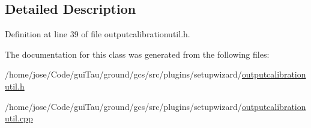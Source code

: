\subsection{Detailed Description}


Definition at line 39 of file outputcalibrationutil.\-h.



The documentation for this class was generated from the following files\-:\begin{DoxyCompactItemize}
\item 
/home/jose/\-Code/gui\-Tau/ground/gcs/src/plugins/setupwizard/\hyperlink{outputcalibrationutil_8h}{outputcalibrationutil.\-h}\item 
/home/jose/\-Code/gui\-Tau/ground/gcs/src/plugins/setupwizard/\hyperlink{outputcalibrationutil_8cpp}{outputcalibrationutil.\-cpp}\end{DoxyCompactItemize}
